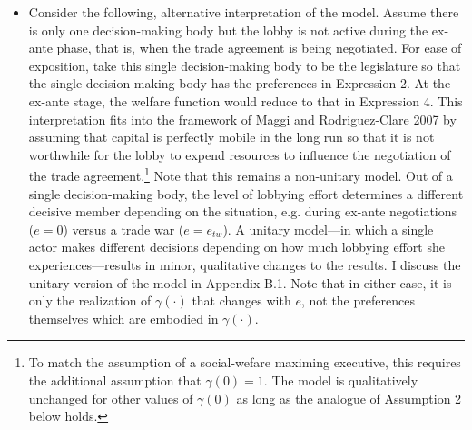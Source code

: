 \documentclass[12pt]{article}
\newcommand{\ga}{\gamma}
\begin{document}
\begin{itemize}
\begin{itemize}
				\item Consider the following, alternative interpretation of the model. Assume there is only one decision-making body but the lobby is not active during the ex-ante phase, that is, when the trade agreement is being negotiated. For ease of exposition, take this single decision-making body to be the legislature so that the single decision-making body has the preferences in Expression 2. At the ex-ante stage, the welfare function would reduce to that in Expression 4. This interpretation fits into the framework of Maggi and Rodriguez-Clare 2007 by assuming that capital is perfectly mobile in the long run so that it is not worthwhile for the lobby to expend resources to influence the negotiation of the trade agreement.\footnote{To match the assumption of a social-wefare maximing executive, this requires the additional assumption that $\ga(0)=1.$ The model is qualitatively unchanged for other values of $\ga(0)$ as long as the analogue of Assumption 2 below holds.} Note that this remains a non-unitary model. Out of a single decision-making body, the level of lobbying effort determines a different decisive member depending on the situation, e.g. during ex-ante negotiations ($e=0$) versus a trade war ($e=e_{tw}$). A unitary model---in which a single actor makes different decisions depending on how much lobbying effort she experiences---results in minor, qualitative changes to the results. I discuss the unitary version of the model in Appendix B.1. Note that in either case, it is only the realization of $\ga(\cdot)$ that changes with $e$, not the preferences themselves which are embodied in $\ga(\cdot)$.

\end{itemize}
\end{itemize}
\end{document}
